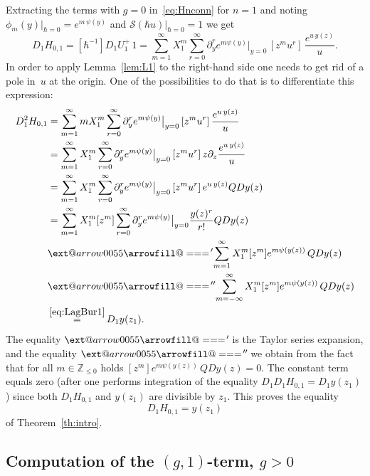 \documentclass[11pt]{article}
\makeatletter
\let\mathcal\mathscr
\def\jepequalfill@{\arrowfill@\Relbar\Relbar\Relbar}
\providecommand{\xlongequal}[2][]{\ext@arrow 0055\jepequalfill@{#1}{#2}}
\theoremstyle{plain}
\theoremstyle{definition}
\theoremstyle{remark}
\newcommand{\cS}{\mathcal{S}}
\makeatother
\begin{document}
Extracting the terms with $g=0$ in~\eqref{eq:Hnconn} for $n=1$ and noting $\phi_m(y)\big|_{\hbar=0}=e^{m\,\psi(y)}$ and $\cS(\hbar u)\big|_{\hbar=0}=1$ we get
\begin{equation*}
D_1H_{0,1}=[\hbar^{-1}]D_1U_1^+\,1=\sum_{m=1}^\infty X_1^m\sum_{r=0}^\infty\partial_y^r e^{m\psi(y)}\big|_{y=0}\,[z^mu^r]\,
\frac{e^{u\,y(z)}}{u}.
\end{equation*}
In order to apply Lemma~\ref{lem:L1} to the right-hand side one needs to get rid of a pole in~$u$ at the origin. One of the possibilities to do that is to differentiate this expression:
\begin{align*}
D_1^2H_{0,1}&=\sum_{m=1}^\infty m X_1^m\sum_{r=0}^\infty\partial_y^r e^{m\psi(y)}\big|_{y=0}\,[z^mu^r]\,
\frac{e^{u\,y(z)}}{u}
\\ &=
\sum_{m=1}^\infty X_1^m\sum_{r=0}^\infty\partial_y^r e^{m\psi(y)}\big|_{y=0}\,[z^mu^r]\,
z\partial_z\frac{e^{u\,y(z)}}{u}
\\ &=
\sum_{m=1}^\infty X_1^m\sum_{r=0}^\infty\partial_y^r e^{m\psi(y)}\big|_{y=0}\,[z^mu^r]\,e^{u\,y(z)}QDy(z)
\\ &=
\sum_{m=1}^\infty X_1^m[z^{m}]\sum_{r=0}^\infty
\partial_y^r e^{m\psi(y)}\big|_{y=0}\frac{y(z)^r}{r!}QDy(z)
\\ &\xlongequal{\!'\!}
\sum_{m=1}^\infty X_1^m[z^{m}] e^{m\psi(y(z))}\,QDy(z)
\\ &\xlongequal{\!''\!}
\sum_{m=-\infty}^\infty X_1^m[z^{m}] e^{m\psi(y(z))}\,QDy(z)
\\ &\mathop{=}^{\eqref{eq:LagBur1}}
D_1y(z_1).
\end{align*}
The equality $\xlongequal{\!'\!}$ is the Taylor series expansion, and the equality $\xlongequal{\!''\!}$ we obtain from the fact that for all $m\in \mathbb{Z}_{\leq 0}$ holds $[z^{m}] e^{m\psi(y(z))}\,QDy(z) =0$.
The constant term equals zero (after one performs integration of the equality $D_1D_1H_{0,1}=D_1 y(z_1)$) since both $D_1H_{0,1}$ and $y(z_1)$ are divisible by $z_1$. This proves the equality
\begin{equation*}
D_1H_{0,1}=y(z_1)
\end{equation*}
of Theorem~\ref{th:intro}.

\subsection{Computation of the \texorpdfstring{$(g,1)$}{(g,1)}-term, \texorpdfstring{$g>0$}{g>0}}
\end{document}
